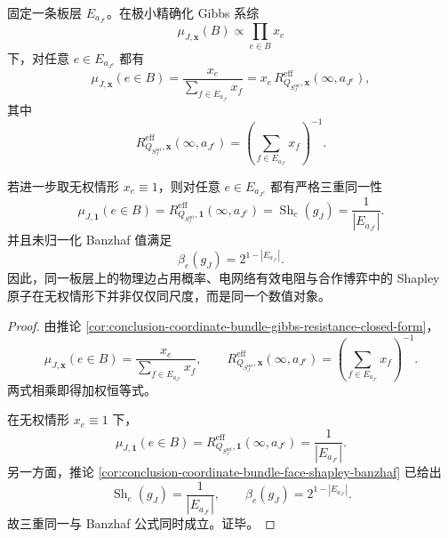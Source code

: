 \begin{theorem}\label{thm:conclusion-coordinatebundle-resistance-shapley-identity}
固定一条板层 \(E_{a_{J^c}}\)。在极小精确化 Gibbs 系综
\[
\mu_{J,\mathbf x}(B)\propto \prod_{e\in B}x_e
\]
下，对任意 \(e\in E_{a_{J^c}}\) 都有
\[
\mu_{J,\mathbf x}(e\in B)
=
\frac{x_e}{\sum_{f\in E_{a_{J^c}}}x_f}
=
x_e\,
R^{\mathrm{eff}}_{Q_{S_J^{\mathrm{int}}},\mathbf x}(\infty,a_{J^c}),
\]
其中
\[
R^{\mathrm{eff}}_{Q_{S_J^{\mathrm{int}}},\mathbf x}(\infty,a_{J^c})
=
\left(\sum_{f\in E_{a_{J^c}}}x_f\right)^{-1}.
\]

若进一步取无权情形 \(x_e\equiv 1\)，则对任意 \(e\in E_{a_{J^c}}\) 都有严格三重同一性
\[
\mu_{J,\mathbf 1}(e\in B)
=
R^{\mathrm{eff}}_{Q_{S_J^{\mathrm{int}}},\mathbf 1}(\infty,a_{J^c})
=
\operatorname{Sh}_e(g_J)
=
\frac{1}{|E_{a_{J^c}}|}.
\]
并且未归一化 Banzhaf 值满足
\[
\beta_e(g_J)=2^{1-|E_{a_{J^c}}|}.
\]
因此，同一板层上的物理边占用概率、电网络有效电阻与合作博弈中的 Shapley 原子在无权情形下并非仅仅同尺度，而是同一个数值对象。
\end{theorem}
\begin{proof}
由推论 \ref{cor:conclusion-coordinate-bundle-gibbs-resistance-closed-form}，
\[
\mu_{J,\mathbf x}(e\in B)=\frac{x_e}{\sum_{f\in E_{a_{J^c}}}x_f},
\qquad
R^{\mathrm{eff}}_{Q_{S_J^{\mathrm{int}}},\mathbf x}(\infty,a_{J^c})
=
\left(\sum_{f\in E_{a_{J^c}}}x_f\right)^{-1}.
\]
两式相乘即得加权恒等式。

在无权情形 \(x_e\equiv 1\) 下，
\[
\mu_{J,\mathbf 1}(e\in B)
=
R^{\mathrm{eff}}_{Q_{S_J^{\mathrm{int}}},\mathbf 1}(\infty,a_{J^c})
=
\frac{1}{|E_{a_{J^c}}|}.
\]
另一方面，推论 \ref{cor:conclusion-coordinate-bundle-face-shapley-banzhaf} 已给出
\[
\operatorname{Sh}_e(g_J)=\frac{1}{|E_{a_{J^c}}|},
\qquad
\beta_e(g_J)=2^{1-|E_{a_{J^c}}|}.
\]
故三重同一与 Banzhaf 公式同时成立。证毕。
\end{proof}

